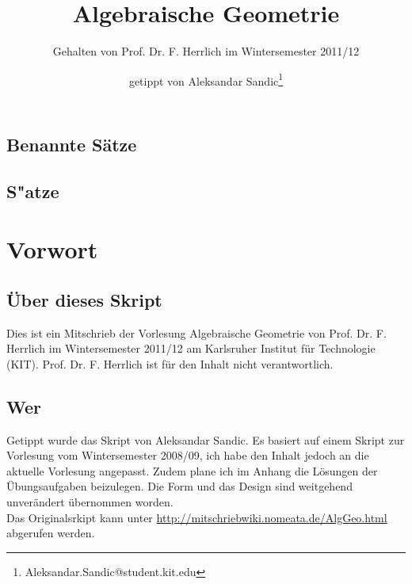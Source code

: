 \documentclass[a4paper, 12pt, numbers=noendperiod, chapterprefix=true]{scrbook}
\title{Algebraische Geometrie}
\subtitle{Gehalten von Prof. Dr. F. Herrlich im Wintersemester 2011/12}
\author{getippt von Aleksandar Sandic\thanks{Aleksandar.Sandic@student.kit.edu}}
\theoremstyle{break}
\theoremstyle{nonumberbreak}
\theoremstyle{nonumberplain}
\newcommand{\quot}[1]{\textrm{\glqq}{#1}\textrm{\grqq}}
\begin{document}
\maketitle

\setlength\parskip{0.6pt}
\tableofcontents

\section*{Benannte S\"atze}


\section*{S"atze}


\setlength\parskip{\smallskipamount}



\chapter{Vorwort}
\setcounter{secnumdepth}{2}
\section*{\"Uber dieses Skript}
Dies ist ein Mitschrieb der Vorlesung \quot{Algebraische Geometrie} von Prof. Dr. F. Herrlich im
Wintersemester 2011/12 am Karlsruher Institut f\"ur Technologie (KIT). Prof. Dr. F. Herrlich ist f\"ur  den Inhalt nicht verantwortlich.\\

\section*{Wer}
Getippt wurde das Skript von Aleksandar Sandic. Es basiert auf einem Skript zur Vorlesung vom Wintersemester 2008/09, ich habe den Inhalt jedoch an die aktuelle Vorlesung angepasst. Zudem plane ich im Anhang die L\"osungen der \"Ubungsaufgaben beizulegen. Die Form und das Design sind weitgehend unver\"andert \"ubernommen worden.\\
Das Originalsrkipt kann unter \url{http://mitschriebwiki.nomeata.de/AlgGeo.html} abgerufen werden.
\end{document}
